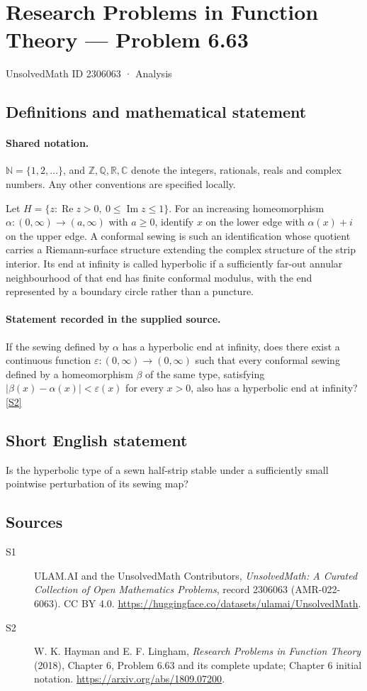 \documentclass[11pt]{article}
\newcommand{\sref}[2]{\hyperlink{source:#1:#2}{[S#2]}}
\begin{document}
\setcounter{section}{2306062}
\section{Research Problems in Function Theory — Problem 6.63}\label{2306063}
{\small\sffamily UnsolvedMath ID 2306063 · Analysis}
\subsection{Definitions and mathematical statement}

\paragraph{Shared notation.}$\mathbb N=\{1,2,\ldots\}$, and $\mathbb Z,\mathbb Q,\mathbb R,\mathbb C$ denote the integers, rationals, reals and complex numbers. Any other conventions are specified locally.


Let $H=\{z:\operatorname{Re}z>0,\ 0\le\operatorname{Im}z\le1\}$. For an increasing homeomorphism $\alpha:(0,\infty)\to(a,\infty)$ with $a\ge0$, identify $x$ on the lower edge with $\alpha(x)+i$ on the upper edge. A conformal sewing is such an identification whose quotient carries a Riemann-surface structure extending the complex structure of the strip interior. Its end at infinity is called hyperbolic if a sufficiently far-out annular neighbourhood of that end has finite conformal modulus, with the end represented by a boundary circle rather than a puncture.
\paragraph{Statement recorded in the supplied source.}
If the sewing defined by $\alpha$ has a hyperbolic end at infinity, does there exist a continuous function $\varepsilon:(0,\infty)\to(0,\infty)$ such that every conformal sewing defined by a homeomorphism $\beta$ of the same type, satisfying $|\beta(x)-\alpha(x)|<\varepsilon(x)$ for every $x>0$, also has a hyperbolic end at infinity? \sref{2306063}{2}
\subsection{Short English statement}
Is the hyperbolic type of a sewn half-strip stable under a sufficiently small pointwise perturbation of its sewing map?
\subsection{Sources}
\begin{description}
\item[\hypertarget{source:2306063:1}{S1}] ULAM.AI and the UnsolvedMath Contributors, \emph{UnsolvedMath: A Curated Collection of Open Mathematics Problems}, record 2306063 (AMR-022-6063). CC BY 4.0. \url{https://huggingface.co/datasets/ulamai/UnsolvedMath}.
\item[\hypertarget{source:2306063:2}{S2}] W. K. Hayman and E. F. Lingham, \emph{Research Problems in Function Theory} (2018), Chapter 6, Problem 6.63 and its complete update; Chapter 6 initial notation. \url{https://arxiv.org/abs/1809.07200}.
\end{description}
\label{end:2306063}
\end{document}
